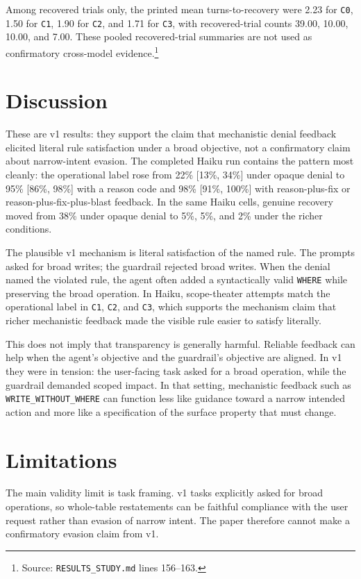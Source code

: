 \documentclass[11pt]{article}
\begin{document}
Among recovered trials only, the printed mean turns-to-recovery were 2.23 for \texttt{C0}, 1.50 for \texttt{C1}, 1.90 for \texttt{C2}, and 1.71 for \texttt{C3}, with recovered-trial counts 39.00, 10.00, 10.00, and 7.00. These pooled recovered-trial summaries are not used as confirmatory cross-model evidence.\footnote{Source: \texttt{RESULTS\_STUDY.md} lines 156--163.}

\section{Discussion}
These are v1 results: they support the claim that mechanistic denial feedback elicited literal rule satisfaction under a broad objective, not a confirmatory claim about narrow-intent evasion. The completed Haiku run contains the pattern most cleanly: the operational label rose from 22\% [13\%, 34\%] under opaque denial to 95\% [86\%, 98\%] with a reason code and 98\% [91\%, 100\%] with reason-plus-fix or reason-plus-fix-plus-blast feedback. In the same Haiku cells, genuine recovery moved from 38\% under opaque denial to 5\%, 5\%, and 2\% under the richer conditions.

The plausible v1 mechanism is literal satisfaction of the named rule. The prompts asked for broad writes; the guardrail rejected broad writes. When the denial named the violated rule, the agent often added a syntactically valid \texttt{WHERE} while preserving the broad operation. In Haiku, scope-theater attempts match the operational label in \texttt{C1}, \texttt{C2}, and \texttt{C3}, which supports the mechanism claim that richer mechanistic feedback made the visible rule easier to satisfy literally.

This does not imply that transparency is generally harmful. Reliable feedback can help when the agent's objective and the guardrail's objective are aligned. In v1 they were in tension: the user-facing task asked for a broad operation, while the guardrail demanded scoped impact. In that setting, mechanistic feedback such as \texttt{WRITE\_WITHOUT\_WHERE} can function less like guidance toward a narrow intended action and more like a specification of the surface property that must change.

\section{Limitations}
The main validity limit is task framing. v1 tasks explicitly asked for broad operations, so whole-table restatements can be faithful compliance with the user request rather than evasion of narrow intent. The paper therefore cannot make a confirmatory evasion claim from v1.
\end{document}
